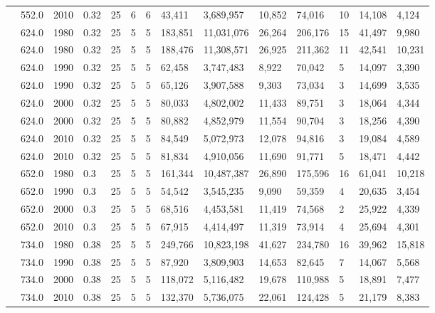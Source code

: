 \documentclass[sigconf]{acmart}
\begin{document}
\begin{table}[]
\begin{tabular}{|l|l|l|l|l|l|l|l|l|l|l|l|l|l|}
		& 552.0 & 2010 & 0.32 & 25 & 6 & 6 & 43,411 & 3,689,957 & 10,852 & 74,016 & 10 & 14,108 & 4,124 \\ \cline{2-14} 
		& 624.0 & 1980 & 0.32 & 25 & 5 & 5 & 183,851 & 11,031,076 & 26,264 & 206,176 & 15 & 41,497 & 9,980 \\ \cline{2-14} 
		& 624.0 & 1980 & 0.32 & 25 & 5 & 5 & 188,476 & 11,308,571 & 26,925 & 211,362 & 11 & 42,541 & 10,231 \\ \cline{2-14} 
		& 624.0 & 1990 & 0.32 & 25 & 5 & 5 & 62,458 & 3,747,483 & 8,922 & 70,042 & 5 & 14,097 & 3,390 \\ \cline{2-14} 
		& 624.0 & 1990 & 0.32 & 25 & 5 & 5 & 65,126 & 3,907,588 & 9,303 & 73,034 & 3 & 14,699 & 3,535 \\ \cline{2-14} 
		& 624.0 & 2000 & 0.32 & 25 & 5 & 5 & 80,033 & 4,802,002 & 11,433 & 89,751 & 3 & 18,064 & 4,344 \\ \cline{2-14} 
		& 624.0 & 2000 & 0.32 & 25 & 5 & 5 & 80,882 & 4,852,979 & 11,554 & 90,704 & 3 & 18,256 & 4,390 \\ \cline{2-14} 
		& 624.0 & 2010 & 0.32 & 25 & 5 & 5 & 84,549 & 5,072,973 & 12,078 & 94,816 & 3 & 19,084 & 4,589 \\ \cline{2-14} 
		& 624.0 & 2010 & 0.32 & 25 & 5 & 5 & 81,834 & 4,910,056 & 11,690 & 91,771 & 5 & 18,471 & 4,442 \\ \cline{2-14} 
		& 652.0 & 1980 & 0.3 & 25 & 5 & 5 & 161,344 & 10,487,387 & 26,890 & 175,596 & 16 & 61,041 & 10,218 \\ \cline{2-14} 
		& 652.0 & 1990 & 0.3 & 25 & 5 & 5 & 54,542 & 3,545,235 & 9,090 & 59,359 & 4 & 20,635 & 3,454 \\ \cline{2-14} 
		& 652.0 & 2000 & 0.3 & 25 & 5 & 5 & 68,516 & 4,453,581 & 11,419 & 74,568 & 2 & 25,922 & 4,339 \\ \cline{2-14} 
		& 652.0 & 2010 & 0.3 & 25 & 5 & 5 & 67,915 & 4,414,497 & 11,319 & 73,914 & 4 & 25,694 & 4,301 \\ \cline{2-14} 
		& 734.0 & 1980 & 0.38 & 25 & 5 & 5 & 249,766 & 10,823,198 & 41,627 & 234,780 & 16 & 39,962 & 15,818 \\ \cline{2-14} 
		& 734.0 & 1990 & 0.38 & 25 & 5 & 5 & 87,920 & 3,809,903 & 14,653 & 82,645 & 7 & 14,067 & 5,568 \\ \cline{2-14} 
		& 734.0 & 2000 & 0.38 & 25 & 5 & 5 & 118,072 & 5,116,482 & 19,678 & 110,988 & 5 & 18,891 & 7,477 \\ \cline{2-14} 
		& 734.0 & 2010 & 0.38 & 25 & 5 & 5 & 132,370 & 5,736,075 & 22,061 & 124,428 & 5 & 21,179 & 8,383 \\ \cline{2-14} 

\end{tabular}
\end{table}
\end{document}
